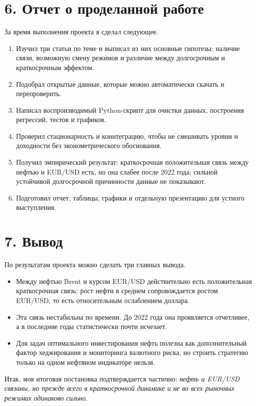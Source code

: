 \documentclass[a4paper,12pt]{article}
\begin{document}
\section*{6. Отчет о проделанной работе}
За время выполнения проекта я сделал следующее.
\begin{enumerate}
    \item Изучил три статьи по теме и выписал из них основные гипотезы: наличие связи, возможную смену режимов и различие между долгосрочным и краткосрочным эффектом.
    \item Подобрал открытые данные, которые можно автоматически скачать и перепроверить.
    \item Написал воспроизводимый Python-скрипт для очистки данных, построения регрессий, тестов и графиков.
    \item Проверил стационарность и коинтеграцию, чтобы не смешивать уровни и доходности без эконометрического обоснования.
    \item Получил эмпирический результат: краткосрочная положительная связь между нефтью и EUR/USD есть, но она слабее после 2022 года; сильной устойчивой долгосрочной причинности данные не показывают.
    \item Подготовил отчет, таблицы, графики и отдельную презентацию для устного выступления.
\end{enumerate}

\section*{7. Вывод}
По результатам проекта можно сделать три главных вывода.

\begin{itemize}
    \item Между нефтью Brent и курсом EUR/USD действительно есть положительная краткосрочная связь: рост нефти в среднем сопровождается ростом EUR/USD, то есть относительным ослаблением доллара.
    \item Эта связь нестабильна по времени. До 2022 года она проявляется отчетливее, а в последние годы статистически почти исчезает.
    \item Для задач оптимального инвестирования нефть полезна как дополнительный фактор хеджирования и мониторинга валютного риска, но строить стратегию только на одном нефтяном индикаторе нельзя.
\end{itemize}

Итак, моя итоговая постановка подтверждается частично: \textit{нефть и EUR/USD связаны, но прежде всего в краткосрочной динамике и не во всех рыночных режимах одинаково сильно.}
\end{document}
